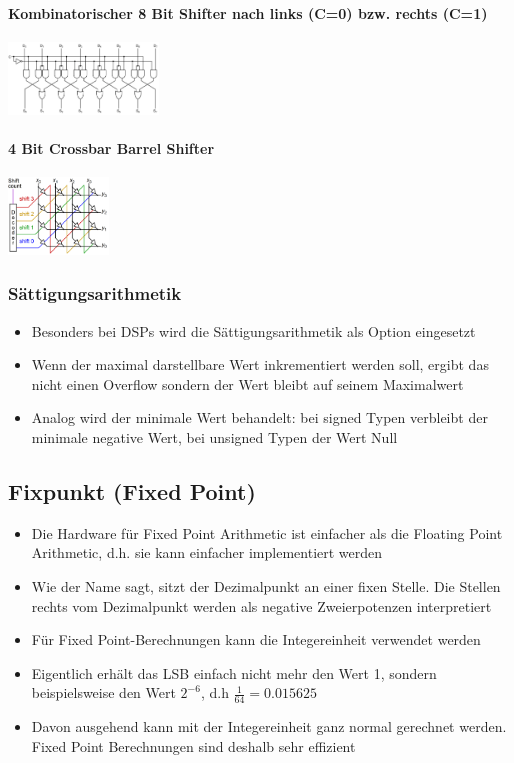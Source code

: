 \begin{multicols}{2}
	\paragraph{Kombinatorischer 8 Bit Shifter nach links (C=0) bzw. rechts (C=1)}
	\includegraphics[width=0.3\textwidth]{images/Arithmetik/Shifter_1}

	\paragraph{4 Bit Crossbar Barrel Shifter}
	\includegraphics[width=0.2\textwidth]{images/Arithmetik/Shifter_2}
\end{multicols}

\subsubsection{Sättigungsarithmetik}
\begin{itemize}
	\item Besonders bei DSPs wird die Sättigungsarithmetik als Option eingesetzt
	\item Wenn der maximal darstellbare Wert inkrementiert werden soll, ergibt das nicht einen Overflow sondern der Wert bleibt auf seinem Maximalwert
	\item Analog wird der minimale Wert behandelt: bei signed Typen verbleibt der minimale negative Wert, bei unsigned Typen der Wert Null
\end{itemize}

\subsection{Fixpunkt (Fixed Point)}
\begin{itemize}
	\item Die Hardware für Fixed Point Arithmetic ist einfacher als die Floating Point Arithmetic, d.h. sie kann einfacher implementiert werden
	\item Wie der Name sagt, sitzt der Dezimalpunkt an einer fixen Stelle. Die Stellen rechts vom Dezimalpunkt werden als negative Zweierpotenzen interpretiert
	\item  Für Fixed Point-Berechnungen kann die Integereinheit verwendet werden
	\item Eigentlich erhält das LSB einfach nicht mehr den Wert 1, sondern beispielsweise den Wert $2^{-6}$, d.h $\frac{1}{64} = 0.015625$
	\item  Davon ausgehend kann mit der Integereinheit ganz normal gerechnet werden. Fixed Point Berechnungen sind deshalb sehr effizient
\end{itemize}

